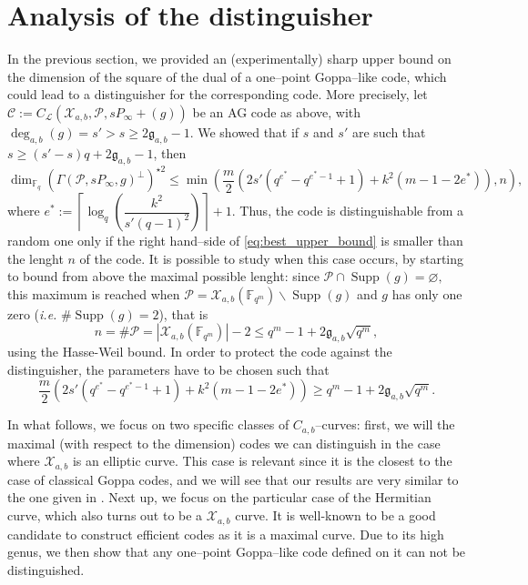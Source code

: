 \documentclass[a4paper]{article}
\theoremstyle{definition}
\theoremstyle{remark}
\newcommand{\calP}{\mathcal{P}}
\newcommand{\calL}{\mathcal{L}}
\newcommand{\calC}{\mathcal{C}}
\newcommand{\calX}{\mathcal{X}}
\newcommand{\fqm}{\mathbb{F}_{q^m}}
\newcommand{\fq}{\mathbb{F}_{q}}
\newcommand{\Supp}{\operatorname{Supp}}
\newcommand{\degab}[1]{\deg_{a,b}\left(#1\right)}
\begin{document}
\section{Analysis of the distinguisher}\label{sec:analysis}

In the previous section, we provided an (experimentally) sharp upper bound on the dimension of the square of the dual of a one--point Goppa--like code, which could lead to a distinguisher for the corresponding code. More precisely, let $\calC := C_\calL(\calX_{a,b},\calP,sP_\infty +(g))$ be an AG code as above, with $\degab{g} = s'>s\geq 2\mathfrak{g}_{a,b}-1$. We showed that if $s$ and $s'$ are such that $s \geq (s'-s)q+2\mathfrak{g}_{a,b}-1$, then
\begin{equation} \label{eq:best_upper_bound}
\dim_{\fq} (\Gamma(\calP,sP_\infty,g)^{\perp})^{\star 2} \leq \min \left(\frac{m}{2}\left(2s'(q^{e^*}-q^{e^*-1}+1)+k^2(m-1-2e^*)  \right),n\right),
\end{equation}
where $e^* := \left\lceil \log_q\left(\dfrac{k^2}{s'(q-1)^2}\right)\right\rceil+1$. Thus, the code is distinguishable from a random one only if the right hand--side of \eqref{eq:best_upper_bound} is smaller than the lenght $n$ of the code. It is possible to study when this case occurs, by starting to bound from above the maximal possible lenght: since $\calP \cap \Supp(g) = \varnothing,$ this maximum is reached when $\calP = \calX_{a,b}(\fqm) \backslash \Supp(g)$ and $g$ has only one zero (\emph{i.e.} $\#\Supp(g)=2$), that is
$$n = \# \calP = |\calX_{a,b}(\fqm)|-2 \leq q^m-1+2\mathfrak{g}_{a,b}\sqrt{q^m},$$
using the Hasse-Weil bound. In order to protect the code against the distinguisher, the parameters have to be chosen such that 
\begin{equation} \label{eq:cond_not_to_distinguish}
\frac{m}{2}\left(2s'(q^{e^*}-q^{e^*-1}+1)+k^2(m-1-2e^*)  \right)\geq q^m-1+2\mathfrak{g}_{a,b}\sqrt{q^m}.
\end{equation}

In what follows, we focus on two specific classes of $C_{a,b}$--curves: first, we will the maximal (with respect to the dimension) codes we can distinguish in the case where $\calX_{a,b}$ is an elliptic curve. This case is relevant since it is the closest to the case of classical Goppa codes, and we will see that our results are very similar to the one given in \cite{MT21}. Next up, we focus on the particular case of the Hermitian curve, which also turns out to be a $\calX_{a,b}$ curve. It is well-known to be a good candidate to construct efficient codes as it is a maximal curve. Due to its high genus, we then show that any one--point Goppa--like code defined on it can not be distinguished.
\end{document}
